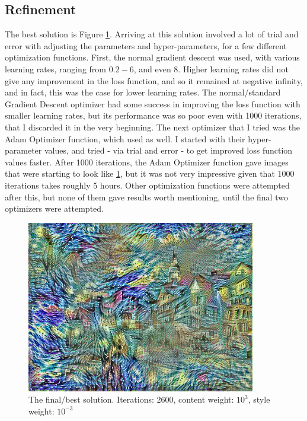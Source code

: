 \documentclass[12pt]{article}
\begin{document}
\subsection{Refinement}
The best solution is Figure \ref{fig:Solution}. Arriving at this solution involved a lot of trial and error with adjusting the parameters and hyper-parameters, for a few different optimization functions. First, the normal gradient descent was used, with various learning rates, ranging from $0.2-6$, and even $8$. Higher learning rates did not give any improvement in the loss function, and so it remained at negative infinity, and in fact, this was the case for lower learning rates. The normal/standard Gradient Descent optimizer had some success in improving the loss function with smaller learning rates, but its performance was so poor even with 1000 iterations, that I discarded it in the very beginning. The next optimizer that I tried was the Adam Optimizer function, which \cite{Github} used as well. I started with their hyper-parameter values, and tried - via trial and error - to get improved loss function values faster. After 1000 iterations, the Adam Optimizer function gave images that were starting to look like \ref{fig:Solution}, but it was not very impressive given that 1000 iterations takes roughly 5 hours. Other optimization functions were attempted after this, but none of them gave results worth mentioning, until the final two optimizers were attempted. 
\begin{figure}
\centering
  \includegraphics[width=100mm, scale = 0.5]{solution5.jpg}
  \caption{The final/best solution. Iterations: $2600$, content weight: $10^3$, style weight: $10^{-3}$}
  \label{fig:Solution}
\end{figure}
\end{document}
